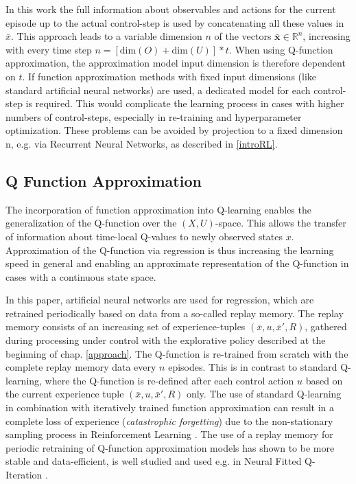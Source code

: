 In this work the full information about observables and actions for the current episode up to the actual control-step is used by concatenating all these values in $\bar{x}$. This approach leads to a variable dimension $n$ of the vectors $\mathbf{\bar{x}}\in \mathbb{R}^n$, increasing with every time step $n=[\mathrm{dim}(O)+\mathrm{dim}(U)]*t$. When using Q-function approximation, the approximation model input dimension is therefore dependent on $t$. If function approximation methods with fixed input dimensions (like standard artificial neural networks) are used, a dedicated model for each control-step is required. This would complicate the learning process in cases with higher numbers of control-steps, especially in re-training and hyperparameter optimization. These problems can be avoided by projection to a fixed dimension n, e.g. via Recurrent Neural Networks, as described in \ref{introRL}.

\subsection{Q Function Approximation}
\label{funcAprox}

The incorporation of function approximation into Q-learning enables the generalization of the Q-function over the $(X, U)$-space. This allows the transfer of information about time-local Q-values to newly observed states $x$. Approximation of the Q-function via regression is thus increasing the learning speed in general and enabling an approximate representation of the Q-function in cases with a continuous state space.

In this paper, artificial neural networks are used for regression, which are retrained periodically based on data from a so-called replay memory. The replay memory consists of an increasing set of experience-tuples $(\bar{x}, u, \bar{x}', R)$, gathered during processing under control with the explorative policy described at the beginning of chap. \ref{approach}. The Q-function is re-trained from scratch with the complete replay memory data every $n$ episodes. This is in contrast to standard Q-learning, where the Q-function is re-defined after each control action $u$ based on the current experience tuple $(\bar{x}, u, \bar{x}', R)$ only. The use of standard Q-learning in combination with iteratively trained function approximation can result in a complete loss of experience (\textit{catastrophic forgetting}) due to the non-stationary sampling process in Reinforcement Learning \cite{French1999}. The use of a replay memory for periodic retraining of Q-function approximation models has shown to be more stable and data-efficient, is well studied and used e.g. in Neural Fitted Q-Iteration \cite{Riedmiller2005}. 

